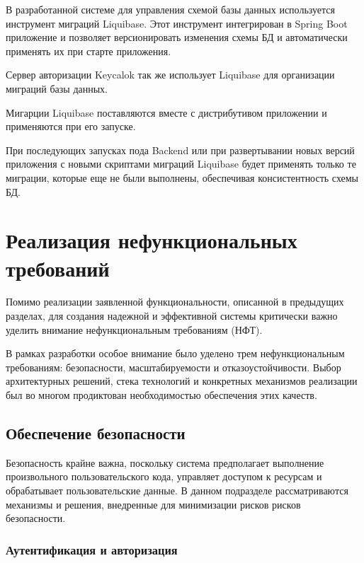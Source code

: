 В разработанной системе для управления схемой базы данных используется инструмент миграций Liquibase. Этот инструмент интегрирован в Spring Boot приложение и позволяет версионировать изменения схемы БД и автоматически применять их при старте приложения.

Сервер авторизации Keycalok так же использует Liquibase для организации миграций базы данных.

Мигарции Liquibase поставляются вместе с дистрибутивом приложении и применяются при его запуске.

При последующих запусках пода Backend или при развертывании новых версий приложения с новыми скриптами миграций Liquibase будет применять только те миграции, которые еще не были выполнены, обеспечивая консистентность схемы БД.

\section{Реализация нефункциональных требований}

Помимо реализации заявленной функциональности, описанной в предыдущих разделах, для создания надежной и эффективной системы критически важно уделить внимание нефункциональным требованиям (НФТ). 

В рамках разработки особое внимание было уделено трем нефункциональным требованиям: безопасности, масштабируемости и отказоустойчивости. Выбор архитектурных решений, стека технологий и конкретных механизмов реализации был во многом продиктован необходимостью обеспечения этих качеств.

\subsection{Обеспечение безопасности}

Безопасность крайне важна, поскольку система предполагает выполнение произвольного пользовательского кода, управляет доступом к ресурсам и обрабатывает пользовательские данные. В данном подразделе рассматриваются механизмы и решения, внедренные для минимизации рисков рисков безопасности.

\subsubsection{Аутентификация и авторизация}

